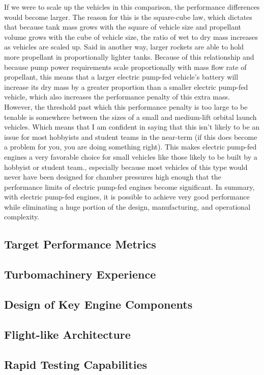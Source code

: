 \documentclass[12pt, letterpaper]{article}
\begin{document}
If we were to scale up the vehicles in this comparison, the performance differences would become larger. The reason for this is the square-cube law, which dictates that because tank mass grows with the square of vehicle size and propellant volume grows with the cube of vehicle size, the ratio of wet to dry mass increases as vehicles are scaled up. Said in another way, larger rockets are able to hold more propellant in proportionally lighter tanks. Because of this relationship and because pump power requirements scale proportionally with mass flow rate of propellant, this means that a larger electric pump-fed vehicle's battery will increase its dry mass by a greater proportion than a smaller electric pump-fed vehicle, which also increases the performance penalty of this extra mass. However, the threshold past which this performance penalty is too large to be tenable is somewhere between the sizes of a small and medium-lift orbital launch vehicles. Which means that I am confident in saying that this isn't likely to be an issue for most hobbyists and student teams in the near-term (if this does become a problem for you, you are doing something right). This makes electric pump-fed engines a very favorable choice for small vehicles like those likely to be built by a hobbyist or student team., especially because most vehicles of this type would never have been designed for chamber pressures high enough that the performance limits of electric pump-fed engines become significant. In summary, with electric pump-fed engines, it is possible to achieve very good performance while eliminating a huge portion of the design, manufacturing, and operational complexity.

\newpage

\subsection{Target Performance Metrics}
\subsection{Turbomachinery Experience}
\subsection{Design of Key Engine Components}
\subsection{Flight-like Architecture}
\subsection{Rapid Testing Capabilities}
\end{document}
